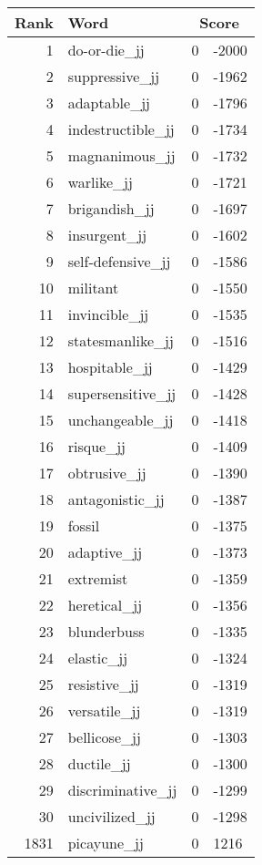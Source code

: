 \begin{longtable}[!htbp]{| rlr@{.}l |}
    \hline
    \textbf{Rank} & \textbf{Word} & \multicolumn{2}{c|}{\textbf{Score}} \\
    \hline
    \endhead
    1 & do-or-die\_jj & 0 & -2000 \\
    2 & suppressive\_jj & 0 & -1962 \\
    3 & adaptable\_jj & 0 & -1796 \\
    4 & indestructible\_jj & 0 & -1734 \\
    5 & magnanimous\_jj & 0 & -1732 \\
    6 & warlike\_jj & 0 & -1721 \\
    7 & brigandish\_jj & 0 & -1697 \\
    8 & insurgent\_jj & 0 & -1602 \\
    9 & self-defensive\_jj & 0 & -1586 \\
    10 & militant & 0 & -1550 \\
    11 & invincible\_jj & 0 & -1535 \\
    12 & statesmanlike\_jj & 0 & -1516 \\
    13 & hospitable\_jj & 0 & -1429 \\
    14 & supersensitive\_jj & 0 & -1428 \\
    15 & unchangeable\_jj & 0 & -1418 \\
    16 & risque\_jj & 0 & -1409 \\
    17 & obtrusive\_jj & 0 & -1390 \\
    18 & antagonistic\_jj & 0 & -1387 \\
    19 & fossil & 0 & -1375 \\
    20 & adaptive\_jj & 0 & -1373 \\
    21 & extremist & 0 & -1359 \\
    22 & heretical\_jj & 0 & -1356 \\
    23 & blunderbuss & 0 & -1335 \\
    24 & elastic\_jj & 0 & -1324 \\
    25 & resistive\_jj & 0 & -1319 \\
    26 & versatile\_jj & 0 & -1319 \\
    27 & bellicose\_jj & 0 & -1303 \\
    28 & ductile\_jj & 0 & -1300 \\
    29 & discriminative\_jj & 0 & -1299 \\
    30 & uncivilized\_jj & 0 & -1298 \\
    1831 & picayune\_jj & 0 & 1216 \\

\end{longtable}
